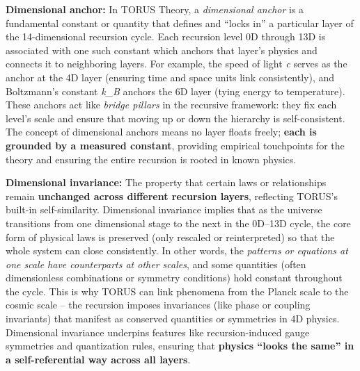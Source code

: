\documentclass[
]{article}
\begin{document}
{\textbf{Dimensional anchor:} In TORUS Theory, a \emph{dimensional
anchor} is a fundamental constant or quantity that defines and ``locks
in'' a particular layer of the 14-dimensional recursion cycle. Each
recursion level 0D through 13D is associated with one such constant
which anchors that layer's physics and connects it to neighboring
layers\hspace{0pt}. For example, the speed of light \emph{c} serves as
the anchor at the 4D layer (ensuring time and space units link
consistently), and Boltzmann's constant
\emph{k_{B}{}} anchors
the 6D layer (tying energy to temperature)\hspace{0pt}. These anchors
act like \emph{bridge pillars} in the recursive framework: they fix each
level's scale and ensure that moving up or down the hierarchy is
self-consistent. The concept of dimensional anchors means no layer
floats freely; \textbf{each is grounded by a measured constant},
providing empirical touchpoints for the theory and ensuring the entire
recursion is rooted in known physics\hspace{0pt}.

\textbf{Dimensional invariance:} The property that certain laws or
relationships remain \textbf{unchanged across different recursion
layers}, reflecting TORUS's built-in self-similarity. Dimensional
invariance implies that as the universe transitions from one dimensional
stage to the next in the 0D--13D cycle, the core form of physical laws
is preserved (only rescaled or reinterpreted) so that the whole system
can close consistently. In other words, the \emph{patterns or equations
at one scale have counterparts at other scales}, and some quantities
(often dimensionless combinations or symmetry conditions) hold constant
throughout the cycle\hspace{0pt}. This is why TORUS can link phenomena
from the Planck scale to the cosmic scale -- the recursion imposes
invariances (like phase or coupling invariants) that manifest as
conserved quantities or symmetries in 4D physics\hspace{0pt}.
Dimensional invariance underpins features like recursion-induced gauge
symmetries and quantization rules, ensuring that \textbf{physics ``looks
the same'' in a self-referential way across all layers}.

}
\end{document}
